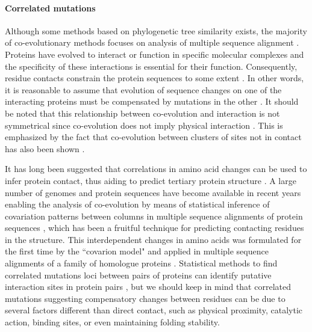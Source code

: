 \paragraph{Correlated mutations}
Although some methods based on phylogenetic tree similarity exists, the majority of co-evolutionary methods focuses on analysis of multiple sequence alignment \cite{rohlfs2010detecting}.
Proteins have evolved to interact or function in specific molecular complexes and the specificity of these interactions is essential for their function. Consequently, residue contacts constrain the protein sequences to some extent \cite{pazos1997correlated}.
In other words, 
it is reasonable to assume that evolution of sequence changes on one of the interacting proteins must be compensated by mutations in the other \cite{pazos1997correlated}.
It should be noted that this relationship between co-evolution and interaction is not symmetrical
since co-evolution does not imply physical interaction \cite{fares2006novel}.
This is emphasized by the fact that co-evolution between clusters of sites not in contact has also been shown \cite{pritchard2000proteins}.

It has long been suggested that correlations in amino acid changes can be used to infer protein contact, thus aiding to predict tertiary protein structure \cite{fitch1970improved, morcos2011direct, burger2010disentangling, de2013emerging}.
A large number of genomes and protein sequences have become available in recent years enabling the analysis of co-evolution by means of statistical inference of covariation patterns between columns in multiple sequence alignments of protein sequences \cite{burger2010disentangling, burger2010disentangling}, which has been a fruitful technique for predicting contacting residues in the structure.
This interdependent changes in amino acids was formulated for the first time by the ``covarion model" \cite{fitch1970improved} and applied in multiple sequence alignments of a family of homologue proteins \cite{de2013emerging}.
Statistical methods to find correlated mutations loci between pairs of proteins can identify putative interaction sites in protein pairs \cite{de2013emerging}, but we should keep in mind that correlated mutations suggesting compensatory changes between residues can be due to several factors different than direct contact, such as physical proximity, catalytic action, binding sites, or even maintaining folding stability.

